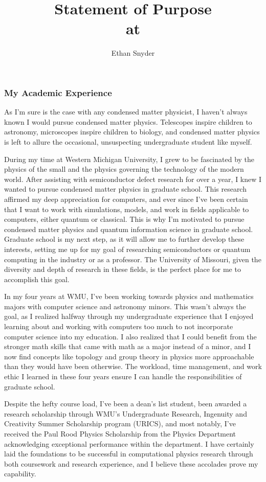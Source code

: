 \documentclass[11pt]{article}
\title{\vspace{-5em}Statement of Purpose\\
	\large \dept{} at \school{}}
\author{Ethan Snyder}
\date{}
\newcommand{\school}{University of Missouri}
\begin{document}
\maketitle
\subsubsection*{My Academic Experience}
As I'm sure is the case with any condensed matter physicist, I haven't always known I would pursue condensed matter physics. Telescopes inspire children to astronomy, microscopes inspire children to biology, and condensed matter physics is left to allure the occasional, unsuspecting undergraduate student like myself.

During my time at Western Michigan University, I grew to be fascinated by the physics of the small and the physics governing the technology of the modern world. After assisting with semiconductor defect research for over a year, I knew I wanted to pursue condensed matter physics in graduate school. This research affirmed my deep appreciation for computers, and ever since I've been certain that I want to work with simulations, models, and work in fields applicable to computers, either quantum or classical. This is why I'm motivated to pursue condensed matter physics and quantum information science in graduate school. Graduate school is my next step, as it will allow me to further develop these interests, setting me up for my goal of researching semiconductors or quantum computing in the industry or as a professor. The \school{}, given the diversity and depth of research in these fields, is the perfect place for me to accomplish this goal.

In my four years at WMU, I've been working towards physics and mathematics majors with computer science and astronomy minors. This wasn't always the goal, as I realized halfway through my undergraduate experience that I enjoyed learning about and working with computers too much to not incorporate computer science into my education. I also realized that I could benefit from the stronger math skills that came with math as a major instead of a minor, and I now find concepts like topology and group theory in physics more approachable than they would have been otherwise. The workload, time management, and work ethic I learned in these four years ensure I can handle the responsibilities of graduate school.

Despite the hefty course load, I've been a dean's list student, been awarded a research scholarship through WMU's Undergraduate Research, Ingenuity and Creativity Summer Scholarship program (URICS), and most notably, I've received the Paul Rood Physics Scholarship from the Physics Department acknowledging exceptional performance within the department. I have certainly laid the foundations to be successful in computational physics research through both coursework and research experience, and I believe these accolades prove my capability.
\end{document}
